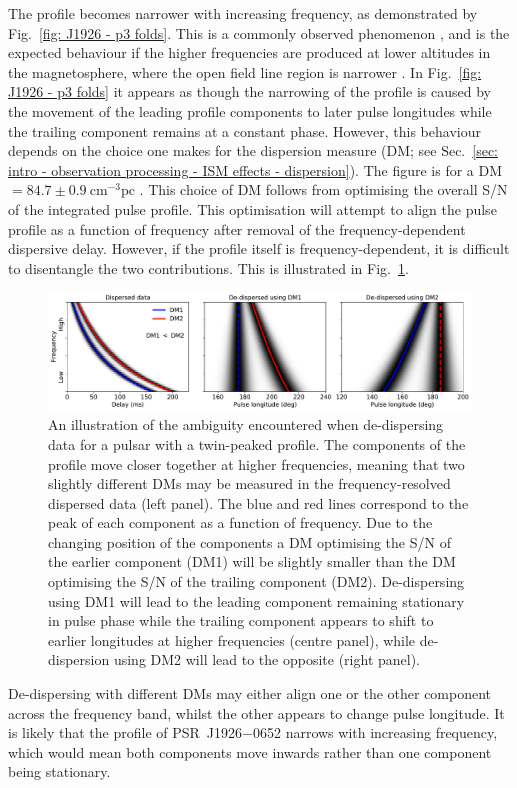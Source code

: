 The profile becomes narrower with increasing frequency, as demonstrated by Fig.~\ref{fig: J1926 - p3 folds}. This is a commonly observed phenomenon \citep[e.g.][]{CWxx2014,PHS+2016}, and is the expected behaviour if the higher frequencies are produced at lower altitudes in the magnetosphere, where the open field line region is narrower \citep[e.g.][]{RSxx1975,KGxx2003}. In Fig.~\ref{fig: J1926 - p3 folds} it appears as though the narrowing of the profile is caused by the movement of the leading profile components to later pulse longitudes while the trailing component remains at a constant phase. However, this behaviour depends on the choice one makes for the dispersion measure (DM; see Sec.~\ref{sec: intro - observation processing - ISM effects - dispersion}). The figure is for a DM$= 84.7 \pm 0.9\ \mathrm{cm}^{-3}\mathrm{pc}$ \citep{ZLH+2019}. This choice of DM follows from optimising the overall S/N of the integrated pulse profile. This optimisation will attempt to align the pulse profile as a function of frequency after removal of the frequency-dependent dispersive delay. However, if the profile itself is frequency-dependent, it is difficult to disentangle the two contributions. This is illustrated in Fig.~\ref{fig: J1926 - dedispersion}.
\begin{figure}
    \begin{center}
        \includegraphics[width=1.0\textwidth]{Figures/J1926/dedispersion_demo}
        \caption[Ambiguity in de-dispersion of a multi-component pulse profile]{An illustration of the ambiguity encountered when de-dispersing data for a pulsar with a twin-peaked profile. The components of the profile move closer together at higher frequencies, meaning that two slightly different DMs may be measured in the frequency-resolved dispersed data (left panel). The blue and red lines correspond to the peak of each component as a function of frequency. Due to the changing position of the components a DM optimising the S/N of the earlier component (DM1) will be slightly smaller than the DM optimising the S/N of the trailing component (DM2). De-dispersing using DM1 will lead to the leading component remaining stationary in pulse phase while the trailing component appears to shift to earlier longitudes at higher frequencies (centre panel), while de-dispersion using DM2 will lead to the opposite (right panel).}
        \label{fig: J1926 - dedispersion}
    \end{center}
\end{figure}
De-dispersing with different DMs may either align one or the other component across the frequency band, whilst the other appears to change pulse longitude. It is likely that the profile of PSR~J1926$-$0652 narrows with increasing frequency, which would mean both components move inwards rather than one component being stationary.

